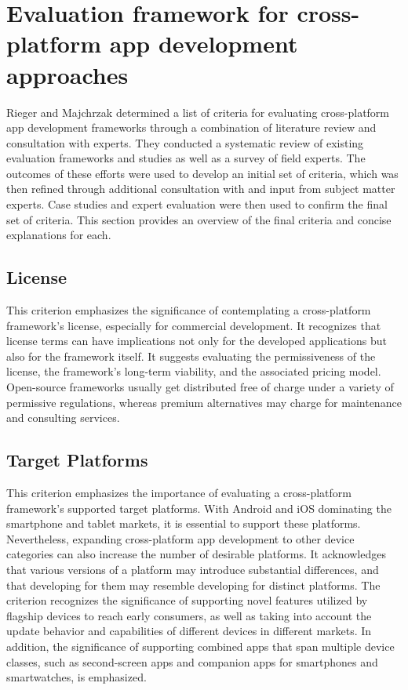 \section{Evaluation framework for cross-platform app
development approaches}

Rieger and Majchrzak determined a list of criteria for evaluating cross-platform app development frameworks through a combination of literature review and consultation with experts. They conducted a systematic review of existing evaluation frameworks and studies as well as a survey of field experts. The outcomes of these efforts were used to develop an initial set of criteria, which was then refined through additional consultation with and input from subject matter experts. Case studies and expert evaluation were then used to confirm the final set of criteria.
This section provides an overview of the final criteria and concise explanations for each.

\subsection{License} 
This criterion emphasizes the significance of contemplating a cross-platform framework's license, especially for commercial development. It recognizes that license terms can have implications not only for the developed applications but also for the framework itself. It suggests evaluating the permissiveness of the license, the framework's long-term viability, and the associated pricing model. Open-source frameworks usually get distributed free of charge under a variety of permissive regulations, whereas premium alternatives may charge for maintenance and consulting services.

\subsection{Target Platforms} 
This criterion emphasizes the importance of evaluating a cross-platform framework's supported target platforms. With Android and iOS dominating the smartphone and tablet markets, it is essential to support these platforms. Nevertheless, expanding cross-platform app development to other device categories can also increase the number of desirable platforms. It acknowledges that various versions of a platform may introduce substantial differences, and that developing for them may resemble developing for distinct platforms. The criterion recognizes the significance of supporting novel features utilized by flagship devices to reach early consumers, as well as taking into account the update behavior and capabilities of different devices in different markets. In addition, the significance of supporting combined apps that span multiple device classes, such as second-screen apps and companion apps for smartphones and smartwatches, is emphasized.

